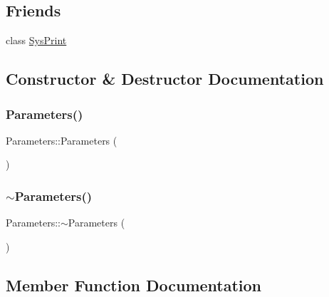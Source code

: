 \subsection*{Friends}
\begin{DoxyCompactItemize}
\item 
class \mbox{\hyperlink{class_parameters_aa0fdc1e103aea3a32f97ca2009dda3e6}{Sys\+Print}}
\end{DoxyCompactItemize}


\subsection{Constructor \& Destructor Documentation}
\mbox{\label{class_parameters_af4d94ee360ac0157d9065f78797fe9a1}} 
\subsubsection{\texorpdfstring{Parameters()}{Parameters()}}
{\footnotesize\ttfamily Parameters\+::\+Parameters (\begin{DoxyParamCaption}{ }\end{DoxyParamCaption})}

\mbox{\label{class_parameters_a640a1a349975a8cb023696f25e563a5c}} 
\subsubsection{\texorpdfstring{$\sim$Parameters()}{~Parameters()}}
{\footnotesize\ttfamily Parameters\+::$\sim$\+Parameters (\begin{DoxyParamCaption}{ }\end{DoxyParamCaption})}



\subsection{Member Function Documentation}
\mbox{\label{class_parameters_afc824aec2ab48afe06829050d0fbe966}} 
